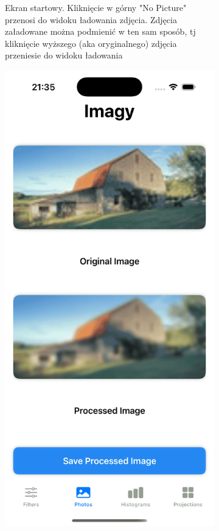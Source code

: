 \documentclass[a4paper]{article}
\begin{document}
\begin{figure}[H]
\begin{subfigure}{0.2\textwidth}
        \caption{Ekran startowy. Kliknięcie w górny "No Picture" przenosi do widoku ładowania zdjęcia. Zdjęcia załadowane można podmienić w ten sam sposób, tj kliknięcie wyższego (aka oryginalnego) zdjęcia przeniesie do widoku ładowania}
        \label{fig:image_load}
    \end{subfigure}
    \begin{subfigure}{0.2\textwidth}
        \centering
        \includegraphics[width=\linewidth]{images/home.png}

\end{subfigure}
\end{figure}
\end{document}

